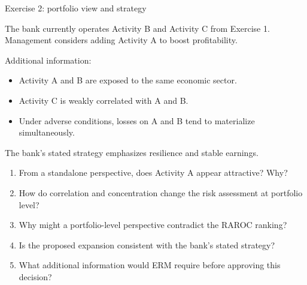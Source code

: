 \documentclass[aspectratio=169, 10pt]{beamer} %
\begin{document}
\begin{frame}{Exercise 2: portfolio view and strategy}

The bank currently operates Activity B and Activity C from Exercise 1.
Management considers adding Activity A to boost profitability.

\medskip

Additional information:
\begin{itemize}
  \item[$\bullet$] Activity A and B are exposed to the same economic sector.
  \item[$\bullet$] Activity C is weakly correlated with A and B.
  \item[$\bullet$] Under adverse conditions, losses on A and B tend to
  materialize simultaneously.
\end{itemize}

The bank’s stated strategy emphasizes resilience and stable earnings.


\begin{enumerate}
  \item From a standalone perspective, does Activity A appear attractive?
  Why?

  \item How do correlation and concentration change the risk assessment at
  portfolio level?

  \item Why might a portfolio-level perspective contradict the RAROC ranking?

  \item Is the proposed expansion consistent with the bank’s stated strategy?

  \item What additional information would ERM require before approving
  this decision?
\end{enumerate}

\end{frame}
\end{document}
